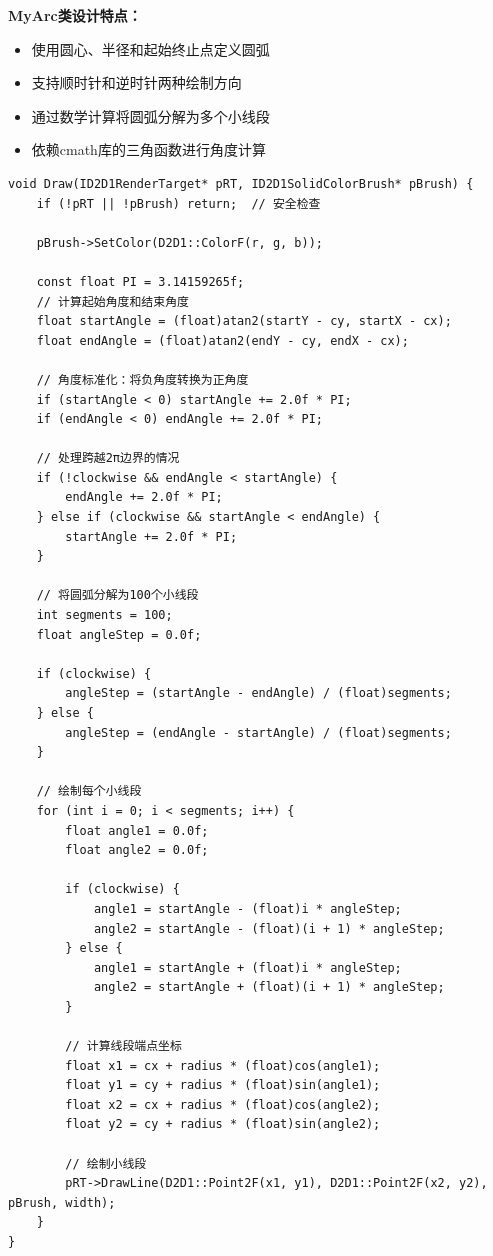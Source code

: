 \documentclass[12pt,a4paper]{article}
\begin{document}
\textbf{MyArc类设计特点：}
\begin{itemize}
    \item 使用圆心、半径和起始终止点定义圆弧
    \item 支持顺时针和逆时针两种绘制方向
    \item 通过数学计算将圆弧分解为多个小线段
    \item 依赖cmath库的三角函数进行角度计算
\end{itemize}
\begin{lstlisting}[caption=圆弧绘制算法核心实现]
void Draw(ID2D1RenderTarget* pRT, ID2D1SolidColorBrush* pBrush) {
    if (!pRT || !pBrush) return;  // 安全检查
    
    pBrush->SetColor(D2D1::ColorF(r, g, b));

    const float PI = 3.14159265f;
    // 计算起始角度和结束角度
    float startAngle = (float)atan2(startY - cy, startX - cx);
    float endAngle = (float)atan2(endY - cy, endX - cx);
    
    // 角度标准化：将负角度转换为正角度
    if (startAngle < 0) startAngle += 2.0f * PI;
    if (endAngle < 0) endAngle += 2.0f * PI;
    
    // 处理跨越2π边界的情况
    if (!clockwise && endAngle < startAngle) {
        endAngle += 2.0f * PI;
    } else if (clockwise && startAngle < endAngle) {
        startAngle += 2.0f * PI;
    }
    
    // 将圆弧分解为100个小线段
    int segments = 100;
    float angleStep = 0.0f;
    
    if (clockwise) {
        angleStep = (startAngle - endAngle) / (float)segments;
    } else {
        angleStep = (endAngle - startAngle) / (float)segments;
    }
    
    // 绘制每个小线段
    for (int i = 0; i < segments; i++) {
        float angle1 = 0.0f;
        float angle2 = 0.0f;
        
        if (clockwise) {
            angle1 = startAngle - (float)i * angleStep;
            angle2 = startAngle - (float)(i + 1) * angleStep;
        } else {
            angle1 = startAngle + (float)i * angleStep;
            angle2 = startAngle + (float)(i + 1) * angleStep;
        }
        
        // 计算线段端点坐标
        float x1 = cx + radius * (float)cos(angle1);
        float y1 = cy + radius * (float)sin(angle1);
        float x2 = cx + radius * (float)cos(angle2);
        float y2 = cy + radius * (float)sin(angle2);
        
        // 绘制小线段
        pRT->DrawLine(D2D1::Point2F(x1, y1), D2D1::Point2F(x2, y2), pBrush, width);
    }
}
\end{lstlisting}
\end{document}
